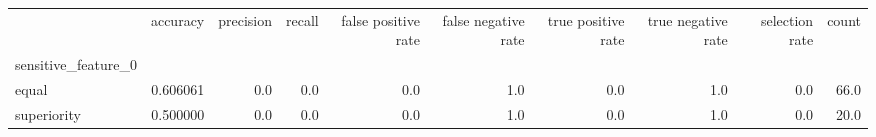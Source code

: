 \begin{tabular}{lrrrrrrrrr}
\toprule
{} &  accuracy &  precision &  recall &  false positive rate &  false negative rate &  true positive rate &  true negative rate &  selection rate &  count \\
sensitive\_feature\_0 &           &            &         &                      &                      &                     &                     &                 &        \\
\midrule
equal               &  0.606061 &        0.0 &     0.0 &                  0.0 &                  1.0 &                 0.0 &                 1.0 &             0.0 &   66.0 \\
superiority         &  0.500000 &        0.0 &     0.0 &                  0.0 &                  1.0 &                 0.0 &                 1.0 &             0.0 &   20.0 \\
\bottomrule
\end{tabular}
